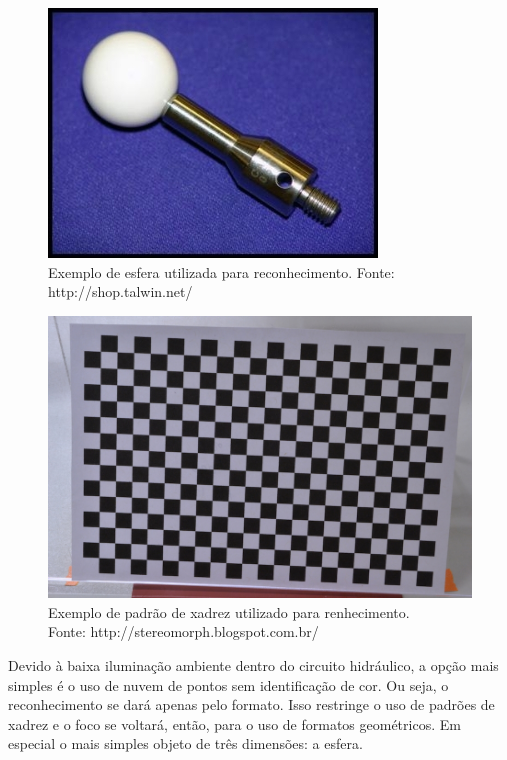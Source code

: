 \begin{figure}[h!]
   \centering
   \includegraphics[width=0.95\columnwidth]{figs/calibracao/sphere_rec}
   \caption{Exemplo de esfera utilizada para reconhecimento. Fonte:
   http://shop.talwin.net/}
   \label{fig::sphere_rec}
\end{figure}



\begin{figure}[h!]
   \centering
   \includegraphics[width=0.95\columnwidth]{figs/calibracao/checkerboard_rec}
   \caption{Exemplo de padrão de xadrez utilizado para renhecimento.\\ Fonte:
   http://stereomorph.blogspot.com.br/}
   \label{fig::checkerboard_rec}
\end{figure}


Devido à baixa iluminação ambiente dentro do circuito hidráulico, a opção
mais simples é o uso de nuvem de pontos sem identificação de cor. Ou seja, o
reconhecimento se dará apenas pelo formato. Isso restringe o uso de padrões de
xadrez e o foco se voltará, então, para o uso de formatos geométricos. Em
especial o mais simples objeto de três dimensões: a esfera.

